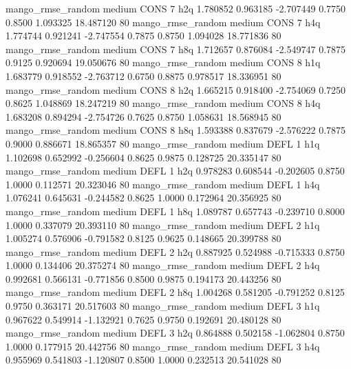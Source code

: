 mango_rmse_random     medium     CONS                 7                  h2q  1.780852 0.963185 -2.707449 0.7750 0.8500  1.093325   18.487120 80
mango_rmse_random     medium     CONS                 7                  h4q  1.774744 0.921241 -2.747554 0.7875 0.8750  1.094028   18.771836 80
mango_rmse_random     medium     CONS                 7                  h8q  1.712657 0.876084 -2.549747 0.7875 0.9125  0.920694   19.050676 80
mango_rmse_random     medium     CONS                 8                  h1q  1.683779 0.918552 -2.763712 0.6750 0.8875  0.978517   18.336951 80
mango_rmse_random     medium     CONS                 8                  h2q  1.665215 0.918400 -2.754069 0.7250 0.8625  1.048869   18.247219 80
mango_rmse_random     medium     CONS                 8                  h4q  1.683208 0.894294 -2.754726 0.7625 0.8750  1.058631   18.568945 80
mango_rmse_random     medium     CONS                 8                  h8q  1.593388 0.837679 -2.576222 0.7875 0.9000  0.886671   18.865357 80
mango_rmse_random     medium     DEFL                 1                  h1q  1.102698 0.652992 -0.256604 0.8625 0.9875  0.128725   20.335147 80
mango_rmse_random     medium     DEFL                 1                  h2q  0.978283 0.608544 -0.202605 0.8750 1.0000  0.112571   20.323046 80
mango_rmse_random     medium     DEFL                 1                  h4q  1.076241 0.645631 -0.244582 0.8625 1.0000  0.172964   20.356925 80
mango_rmse_random     medium     DEFL                 1                  h8q  1.089787 0.657743 -0.239710 0.8000 1.0000  0.337079   20.393110 80
mango_rmse_random     medium     DEFL                 2                  h1q  1.005274 0.576906 -0.791582 0.8125 0.9625  0.148665   20.399788 80
mango_rmse_random     medium     DEFL                 2                  h2q  0.887925 0.524988 -0.715333 0.8750 1.0000  0.134406   20.375274 80
mango_rmse_random     medium     DEFL                 2                  h4q  0.992681 0.566131 -0.771856 0.8500 0.9875  0.194173   20.443256 80
mango_rmse_random     medium     DEFL                 2                  h8q  1.004268 0.581205 -0.791252 0.8125 0.9750  0.363171   20.517603 80
mango_rmse_random     medium     DEFL                 3                  h1q  0.967622 0.549914 -1.132921 0.7625 0.9750  0.192691   20.480128 80
mango_rmse_random     medium     DEFL                 3                  h2q  0.864888 0.502158 -1.062804 0.8750 1.0000  0.177915   20.442756 80
mango_rmse_random     medium     DEFL                 3                  h4q  0.955969 0.541803 -1.120807 0.8500 1.0000  0.232513   20.541028 80
